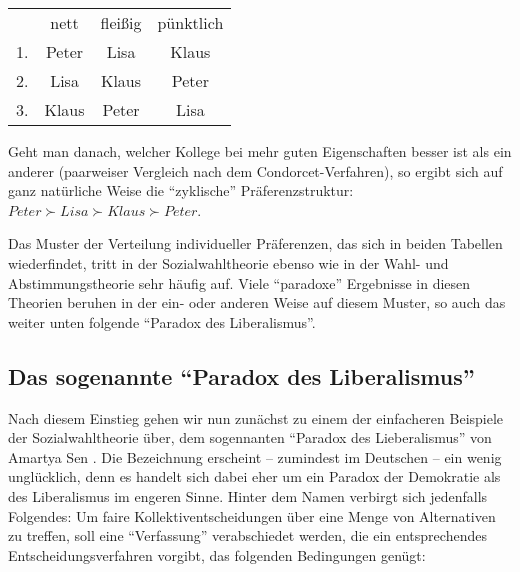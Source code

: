 \begin{center}
\begin{tabular}{c|ccc}
   & nett & fleißig & pünktlich \\
\cline{1-4}
1. & Peter & Lisa  & Klaus \\
2. & Lisa  & Klaus & Peter \\
3. & Klaus & Peter & Lisa \\
\end{tabular}
\end{center}

Geht man danach, welcher Kollege bei mehr guten Eigenschaften besser ist als ein
anderer (paarweiser Vergleich nach dem Condorcet-Verfahren), so ergibt sich auf
ganz natürliche Weise die "`zyklische"' Präferenzstruktur: $Peter \succ Lisa
\succ Klaus \succ Peter$.

Das Muster der Verteilung individueller Präferenzen, das sich in beiden Tabellen
wiederfindet, tritt in der Sozialwahltheorie ebenso wie in der Wahl- und
Abstimmungstheorie sehr häufig auf. Viele "`paradoxe"' Ergebnisse in diesen
Theorien beruhen in der ein- oder anderen Weise auf diesem Muster, so auch das
weiter unten folgende "`Paradox des Liberalismus"'.



\subsection{Das sogenannte "`Paradox des Liberalismus"'} 
\label{LiberalismusParadox}
Nach diesem Einstieg gehen wir nun zunächst zu einem der einfacheren Beispiele
der Sozialwahltheorie über, dem sogennanten "`Paradox des Lieberalismus"' von
Amartya Sen \cite[]{kliemt-lahno:2005}. Die Bezeichnung erscheint -- zumindest im
Deutschen -- ein wenig unglücklich, denn es handelt sich dabei
eher um ein Paradox der Demokratie als des Liberalismus im engeren Sinne. Hinter
dem Namen verbirgt sich jedenfalls Folgendes: Um faire Kollektiventscheidungen über eine
Menge von Alternativen zu treffen, soll eine "`Verfassung"' verabschiedet werden,
die ein entsprechendes Entscheidungsverfahren vorgibt, das folgenden Bedingungen
genügt:

